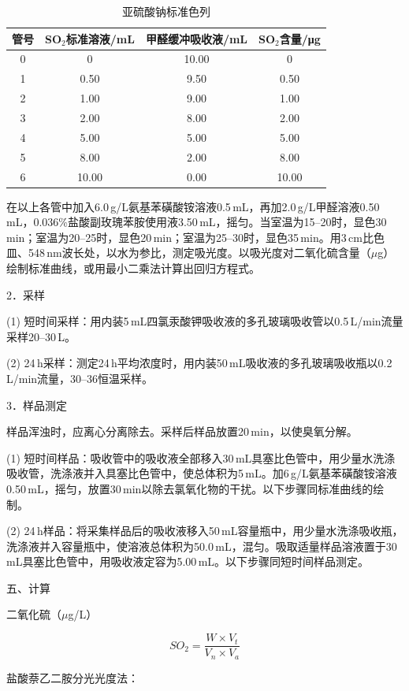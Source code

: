 \documentclass[12pt,hyperref,a4paper,UTF8]{ctexart}
\begin{document}
\begin{table}[h]
\centering
\caption{亚硫酸钠标准色列}
\label{tab:experiment_data1}
\begin{tabular}{@{}cccc@{}}
\toprule
管号 & SO$_2$标准溶液/mL & 甲醛缓冲吸收液/mL & SO$_2$含量/μg \\
\midrule
0 & 0 & 10.00 & 0 \\
1 & 0.50 & 9.50 & 0.50 \\
2 & 1.00 & 9.00 & 1.00 \\
3 & 2.00 & 8.00 & 2.00 \\
4 & 5.00 & 5.00 & 5.00 \\
5 & 8.00 & 2.00 & 8.00 \\
6 & 10.00 & 0.00 & 10.00 \\
\bottomrule
\end{tabular}
\end{table}

在以上各管中加入6.0\,g/L氨基苯磺酸铵溶液0.5\,mL，再加2.0\,g/L甲醛溶液0.50\,mL，0.036\%盐酸副玫瑰苯胺使用液3.50\,mL，摇匀。当室温为15--20\textcelsius{}时，显色30\,min；室温为20--25\textcelsius{}时，显色20\,min；室温为25--30\textcelsius{}时，显色35\,min。用3\,cm比色皿、548\,nm波长处，以水为参比，测定吸光度。以吸光度对二氧化硫含量（$\mu$g）绘制标准曲线，或用最小二乘法计算出回归方程式。

2．采样

(1) 短时间采样：用内装5\,mL四氯汞酸钾吸收液的多孔玻璃吸收管以0.5\,L/min流量采样20--30\,L。

(2) 24\,h采样：测定24\,h平均浓度时，用内装50\,mL吸收液的多孔玻璃吸收瓶以0.2\,L/min流量，30--36\textcelsius{}恒温采样。

3．样品测定

样品浑浊时，应离心分离除去。采样后样品放置20\,min，以使臭氧分解。

(1) 短时间样品：吸收管中的吸收液全部移入30\,mL具塞比色管中，用少量水洗涤吸收管，洗涤液并入具塞比色管中，使总体积为5\,mL。加6\,g/L氨基苯磺酸铵溶液0.50\,mL，摇匀，放置30\,min以除去氯氧化物的干扰。以下步骤同标准曲线的绘制。

(2) 24\,h样品：将采集样品后的吸收液移入50\,mL容量瓶中，用少量水洗涤吸收瓶，洗涤液并入容量瓶中，使溶液总体积为50.0\,mL，混匀。吸取适量样品溶液置于30\,mL具塞比色管中，用吸收液定容为5.00\,mL。以下步骤同短时间样品测定。

五、计算

二氧化硫（$\mu$g/L）

\[
SO_2 = \dfrac{W \times V_t}{V_n \times V_a}
\]

盐酸萘乙二胺分光光度法：
\end{document}
